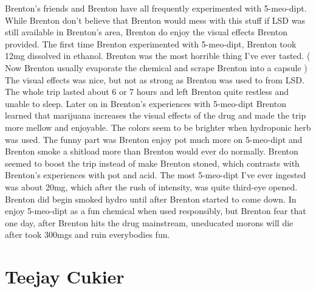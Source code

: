 \documentclass[12pt]{book}
\begin{document}
Brenton's friends and Brenton have all frequently experimented with 5-meo-dipt. While Brenton don't believe that Brenton would mess with this stuff if LSD was still available in Brenton's area, Brenton do enjoy the visual effects Brenton provided. The first time Brenton experimented with 5-meo-dipt, Brenton took 12mg dissolved in ethanol. Brenton was the most horrible thing I've ever tasted. ( Now Brenton usually evaporate the chemical and scrape Brenton into a capsule ) The visual effects was nice, but not as strong as Brenton was used to from LSD. The whole trip lasted about 6 or 7 hours and left Brenton quite restless and unable to sleep. Later on in Brenton's experiences with 5-meo-dipt Brenton learned that marijuana increases the visual effects of the drug and made the trip more mellow and enjoyable. The colors seem to be brighter when hydroponic herb was used. The funny part was Brenton enjoy pot much more on 5-meo-dipt and Brenton smoke a shitload more than Brenton would ever do normally. Brenton seemed to boost the trip instead of make Brenton stoned, which contrasts with Brenton's experiences with pot and acid. The most 5-meo-dipt I've ever ingested was about 20mg, which after the rush of intensity, was quite third-eye opened. Brenton did begin smoked hydro until after Brenton started to come down. In enjoy 5-meo-dipt as a fun chemical when used responsibly, but Brenton fear that one day, after Brenton hits the drug mainstream, uneducated morons will die after took 300mgs and ruin everybodies fun.



\chapter{Teejay Cukier}
\end{document}
